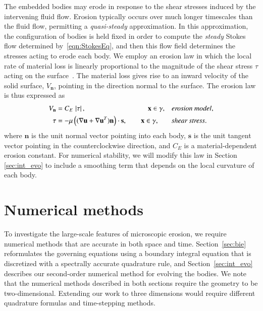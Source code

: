 \documentclass[3p]{elsarticle}
\newcommand{\edit}[1]{{\color{red} #1}}
\newcommand{\nn}{{\mathbf{n}}}
\renewcommand{\ss}{{\mathbf{s}}}
\newcommand{\uu}{{\mathbf{u}}}
\newcommand{\xx}{{\mathbf{x}}}
\newcommand{\abs}[1]{\left| #1 \right|}
\newcommand{\Vn}{V_\nn}
\newcommand{\CE}{C_E}
\begin{document}
The embedded bodies may erode in response to the shear stresses induced by the intervening fluid flow. Erosion typically occurs over much longer timescales than the fluid flow, permitting a {\em quasi-steady} approximation. In this approximation, the configuration of bodies is held fixed in order to compute the {\em steady} Stokes flow determined by~\eqref{eqn:StokesEq}, and then this flow field determines the stresses acting to erode each body. We employ an erosion law in which the local rate of material loss is linearly proportional to the magnitude of the shear stress $\tau$ acting on the surface~\cite{Ristroph2012, Moore2013, Mitchell2016, MooreCPAM2017, HewettJFS2017, quaife2018boundary, chiu2020viscous}. The material loss gives rise to an inward velocity of the solid surface, $\Vn$, pointing in the direction normal to the surface. The erosion law is thus expressed as
\begin{align}
\Vn &= \CE \, \abs{\tau}, 
	\hspace{88pt} \xx \in \gamma, &&\mbox{\em erosion model}, 
\label{Vn0} \\
\tau &= -\mu \left( ( \nabla \uu + \nabla \uu^T) \nn \right) \cdot \ss,
	\hspace{20pt} \xx \in \gamma, &&\mbox{\em shear stress}.
\label{tau0}
\end{align}
where $\nn$ is the unit normal vector pointing into each body, $\ss$ is the unit tangent vector pointing in the counterclockwise direction, and $\CE$ is a material-dependent erosion constant.
\edit{For numerical stability, we will modify this law in Section \ref{sec:int_evo} to include a smoothing term that depends on the local curvature of each body.}



\section{\edit{Numerical methods}}
\label{sec:numerics}
\edit{To investigate the large-scale features of microscopic erosion, we
require numerical methods that are accurate in both space and time.
Section~\ref{sec:bie} reformulates the governing equations using a
boundary integral equation that is discretized with a spectrally
accurate quadrature rule, and Section~\ref{sec:int_evo} describes our
second-order numerical method for evolving the bodies. We note that the
numerical methods described in both sections require the geometry
to be two-dimensional. Extending our work to three dimensions would require
 different quadrature formulas and time-stepping methods.}
\end{document}
